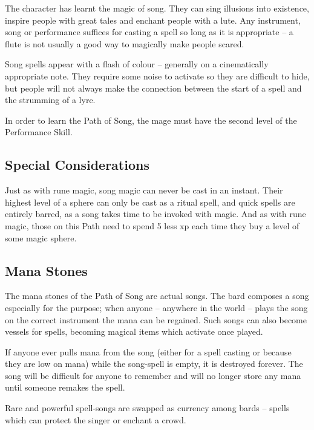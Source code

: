 \begin{multicols}{2}

The character has learnt the magic of song. They can sing illusions into existence, inspire people with great tales and enchant people with a lute. Any instrument, song or performance suffices for casting a spell so long as it is appropriate -- a flute is not usually a good way to magically make people scared.

Song spells appear with a flash of colour -- generally on a cinematically appropriate note. They require some noise to activate so they are difficult to hide, but people will not always make the connection between the start of a spell and the strumming of a lyre.

In order to learn the Path of Song, the mage must have the second level of the Performance Skill. 

\subsection{Special Considerations}

Just as with rune magic, song magic can never be cast in an instant.  Their highest level of a sphere can only be cast as a ritual spell, and quick spells are entirely barred, as a song takes time to be invoked with magic.  And as with rune magic, those on this Path need to spend 5 less \gls{xp} each time they buy a level of some magic sphere.

\subsection{Mana Stones}

The mana stones of the Path of Song are actual songs. The bard composes a song especially for the purpose; when anyone -- anywhere in the world -- plays the song on the correct instrument the mana can be regained. Such songs can also become vessels for spells, becoming magical items which activate once played.

If anyone ever pulls mana from the song (either for a spell casting or because they are low on mana) while the song-spell is empty, it is destroyed forever. The song will be difficult for anyone to remember and will no longer store any mana until someone remakes the spell.

Rare and powerful spell-songs are swapped as currency among bards -- spells which can protect the singer or enchant a crowd.

\end{multicols}



